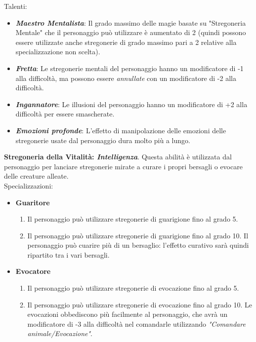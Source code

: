 \documentclass[../manuale_main.tex]{subfiles}
\begin{document}
Talenti:

\begin{itemize}
\item \textbf{\textit{Maestro Mentalista}}: Il grado massimo delle magie basate su "Stregoneria Mentale" che il personaggio può utilizzare è aumentato di 2 (quindi possono essere utilizzate anche stregonerie di grado massimo pari a 2 relative alla specializzazione non scelta).
\item \textbf{\textit{Fretta}}: Le stregonerie mentali del personaggio hanno un modificatore di -1 alla difficoltà, ma possono essere \textit{annullate} con un modificatore di -2 alla difficoltà.
\item \textbf{\textit{Ingannatore}}: Le illusioni del personaggio hanno un modificatore di +2 alla difficoltà per essere smascherate.
\item \textbf{\textit{Emozioni profonde}}: L'effetto di manipolazione delle emozioni delle stregonerie usate dal personaggio dura molto più a lungo.
\end{itemize}

\textbf{Stregoneria della Vitalità: \textit{Intelligenza}}. Questa abilità è utilizzata dal personaggio per lanciare stregonerie mirate a curare i propri bersagli o evocare delle creature alleate.
\\Specializzazioni:

\begin{itemize} 
\item\textbf{Guaritore}
\begin{enumerate}
\item Il personaggio può utilizzare stregonerie di guarigione fino al grado 5.
\item Il personaggio può utilizzare stregonerie di guarigione fino al grado 10. Il personaggio può cuarire più di un bersaglio: l'effetto curativo sarà quindi ripartito tra i vari bersagli.

\end{enumerate}

\item\textbf{Evocatore}
\begin{enumerate}
\item Il personaggio può utilizzare stregonerie di evocazione fino al grado 5.
\item Il personaggio può utilizzare stregonerie di evocazione fino al grado 10. Le evocazioni obbediscono più facilmente al personaggio, che avrà un modificatore di -3 alla difficoltà nel comandarle utilizzando \textit{"Comandare animale/Evocazione"}.

\end{enumerate}
\end{itemize}
\end{document}
